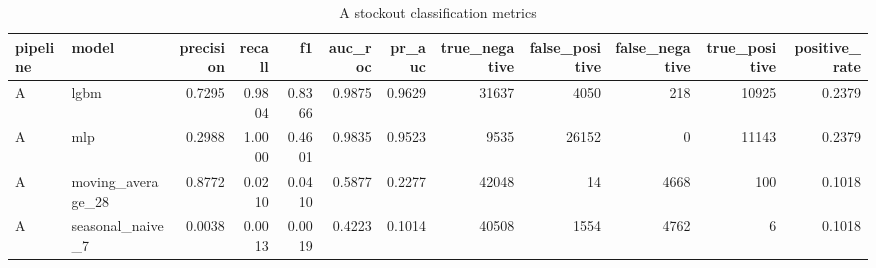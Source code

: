 \begin{table}
\caption{A stockout classification metrics}
\label{tab:classification-A}
\begin{tabular}{llrrrrrrrrrr}
\toprule
pipeline & model & precision & recall & f1 & auc\_roc & pr\_auc & true\_negative & false\_positive & false\_negative & true\_positive & positive\_rate \\
\midrule
A & lgbm & 0.7295 & 0.9804 & 0.8366 & 0.9875 & 0.9629 & 31637 & 4050 & 218 & 10925 & 0.2379 \\
A & mlp & 0.2988 & 1.0000 & 0.4601 & 0.9835 & 0.9523 & 9535 & 26152 & 0 & 11143 & 0.2379 \\
A & moving\_average\_28 & 0.8772 & 0.0210 & 0.0410 & 0.5877 & 0.2277 & 42048 & 14 & 4668 & 100 & 0.1018 \\
A & seasonal\_naive\_7 & 0.0038 & 0.0013 & 0.0019 & 0.4223 & 0.1014 & 40508 & 1554 & 4762 & 6 & 0.1018 \\
\bottomrule
\end{tabular}
\end{table}
